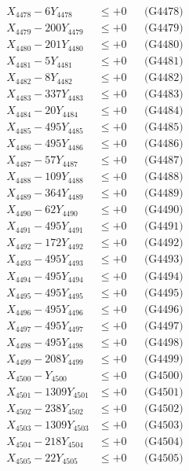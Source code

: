 \documentclass[a4paper,10pt]{article}
\begin{document}
{\begin{align}
X_{4478} - 6Y_{4478} &\leq +0 && \text{(G4478)} \\
X_{4479} - 200Y_{4479} &\leq +0 && \text{(G4479)} \\
X_{4480} - 201Y_{4480} &\leq +0 && \text{(G4480)} \\
\allowbreak
X_{4481} - 5Y_{4481} &\leq +0 && \text{(G4481)} \\
X_{4482} - 8Y_{4482} &\leq +0 && \text{(G4482)} \\
X_{4483} - 337Y_{4483} &\leq +0 && \text{(G4483)} \\
X_{4484} - 20Y_{4484} &\leq +0 && \text{(G4484)} \\
X_{4485} - 495Y_{4485} &\leq +0 && \text{(G4485)} \\
X_{4486} - 495Y_{4486} &\leq +0 && \text{(G4486)} \\
X_{4487} - 57Y_{4487} &\leq +0 && \text{(G4487)} \\
X_{4488} - 109Y_{4488} &\leq +0 && \text{(G4488)} \\
X_{4489} - 364Y_{4489} &\leq +0 && \text{(G4489)} \\
X_{4490} - 62Y_{4490} &\leq +0 && \text{(G4490)} \\
\allowbreak
X_{4491} - 495Y_{4491} &\leq +0 && \text{(G4491)} \\
X_{4492} - 172Y_{4492} &\leq +0 && \text{(G4492)} \\
X_{4493} - 495Y_{4493} &\leq +0 && \text{(G4493)} \\
X_{4494} - 495Y_{4494} &\leq +0 && \text{(G4494)} \\
X_{4495} - 495Y_{4495} &\leq +0 && \text{(G4495)} \\
X_{4496} - 495Y_{4496} &\leq +0 && \text{(G4496)} \\
X_{4497} - 495Y_{4497} &\leq +0 && \text{(G4497)} \\
X_{4498} - 495Y_{4498} &\leq +0 && \text{(G4498)} \\
X_{4499} - 208Y_{4499} &\leq +0 && \text{(G4499)} \\
X_{4500} - Y_{4500} &\leq +0 && \text{(G4500)} \\
\allowbreak
X_{4501} - 1309Y_{4501} &\leq +0 && \text{(G4501)} \\
X_{4502} - 238Y_{4502} &\leq +0 && \text{(G4502)} \\
X_{4503} - 1309Y_{4503} &\leq +0 && \text{(G4503)} \\
X_{4504} - 218Y_{4504} &\leq +0 && \text{(G4504)} \\
X_{4505} - 22Y_{4505} &\leq +0 && \text{(G4505)} \\

\end{align}}
\end{document}
